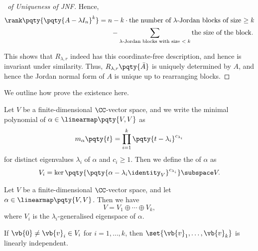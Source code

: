 \begin{proof}[\proofname\ of Uniqueness of JNF]
    Hence,
    \begin{align*}
        \rank\pqty{\pqty{A - \lambda I_n}^k} &= n - k \cdot \text{the number of \(\lambda\)-Jordan blocks of size \(\geq k\)} \\
        &\phantom{=} \quad - \sum_{\text{\(\lambda\)-Jordan blocks with size \(< k\)}} \text{the size of the block}.
    \end{align*}

    This shows that \(R_{\lambda, r}\) indeed has this coordinate-free description, and hence is invariant under similarity. Thus, \(R_{\lambda, r} \pqty{\bar{A}}\) is uniquely determined by \(A\), and hence the Jordan normal form of \(A\) is unique up to rearranging blocks.
\end{proof}

We outline how prove the existence here.

\begin{definition}
    Let \(V\) be a finite-dimensional \(\CC\)-vector space, and we write the minimal polynomial of \(\alpha \in \linearmap\pqty{V, V}\) as
    \[
        m_{\alpha}\pqty{t} = \prod_{i = 1}^{k} \pqty{t - \lambda_i}^{c_{\lambda_i}}
    \]
    for distinct eigenvalues \(\lambda_i\) of \(\alpha\) and \(c_i \geq 1\). Then we define the  of \(\alpha\) as
    \[
        V_i = \ker\pqty{\pqty{\alpha - \lambda_i \identity_V}^{c_{\lambda_i}}} \subspace V.
    \]
\end{definition}

\begin{theorem}
    \label{thm:generalised-eigenspace-decomposition}%
    Let \(V\) be a finite-dimensional \(\CC\)-vector space, and let \(\alpha \in \linearmap\pqty{V, V}\). Then we have
    \[
        V = V_1 \oplus \cdots \oplus V_k,
    \]
    where \(V_i\) is the \(\lambda_i\)-generalised eigenspace of \(\alpha\).
\end{theorem}

\begin{lemma}
    \label{lem:linear-independence-generalised-eigenspaces}%
    If \(\vb{0} \neq \vb{v}_i \in V_i\) for \(i = 1, \ldots, k\), then \(\set{\vb{v}_1, \ldots, \vb{v}_k}\) is linearly independent.
\end{lemma}

